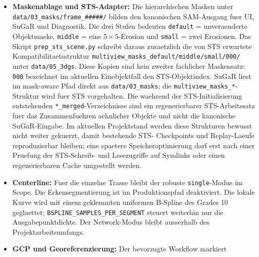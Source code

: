 \documentclass[12pt,a4paper]{article}
\begin{document}
\begin{itemize}
           SuGaR-Dev-Overlay keine Berechtigungsprobleme am internen
           \texttt{/opt/sugar/output}-Pfad erzeugt. Fuer die Poisson-Extraktion
           werden Background-Punktwolken mit weniger als drei Punkten oder
           ungueltigen Normalen uebersprungen; bei der Alurohr-Geometrie kann
           der Background durch die kamera-basierte Bounding-Box auf nur ein
           oder zwei Punkte schrumpfen, waehrend das Foreground-Mesh gueltig
           bleibt.
    \item \textbf{Maskenablage und STS-Adapter:} Die hierarchischen Masken
          unter \texttt{data/03\_masks/frame\_\#\#\#\#\#/} bilden den kanonischen
          SAM-Ausgang fuer UI, SuGaR und Diagnostik. Die drei Stufen bedeuten
          \texttt{default} = unveraenderte Objektmaske,
          \texttt{middle} = eine $5\times5$-Erosion und
          \texttt{small} = zwei Erosionen. Das Skript
          \texttt{prep\_sts\_scene.py} schreibt daraus zusaetzlich die von
          STS erwartete Kompatibilitaetsstruktur
          \texttt{multiview\_masks\_default/middle/small/000/} unter
          \texttt{data/05\_3dgs}. Diese Kopien sind kein zweiter fachlicher
          Maskensatz: \texttt{000} bezeichnet im aktuellen Einobjektfall den
          STS-Objektindex. SuGaR liest im mask-aware Pfad direkt aus
          \texttt{data/03\_masks}; die \texttt{multiview\_masks\_*}-Struktur
          wird fuer STS vorgehalten. Die waehrend der STS-Initialisierung
          entstehenden \texttt{*\_merged}-Verzeichnisse sind ein regenerierbarer
          STS-Arbeitssatz fuer das Zusammenfuehren aehnlicher Objekte und nicht
          die kanonische SuGaR-Eingabe. Im aktuellen Projektstand werden diese
          Strukturen bewusst nicht weiter gekuerzt, damit bestehende STS-
          Checkpoints und Replay-Laeufe reproduzierbar bleiben; eine spaetere
          Speicheroptimierung darf erst nach einer Pruefung der STS-Schreib-
          und Lesezugriffe auf Symlinks oder einen regenerierbaren Cache
          umgestellt werden.
    \item \textbf{Centerline:} Fuer die einzelne Trasse bleibt der robuste
          \texttt{single}-Modus im Scope. Die Eckensegmentierung ist im
          Produktionspfad deaktiviert. Die lokale Kurve wird mit einem
          geklemmten uniformen B-Spline des Grades 10 geglaettet;
          \texttt{BSPLINE\_SAMPLES\_PER\_SEGMENT} steuert weiterhin nur die
          Ausgabepunktdichte. Der Network-Modus bleibt ausserhalb des
          Projektarbeitsumfangs.
    \item \textbf{GCP und Georeferenzierung:} Der bevorzugte Workflow markiert

\end{itemize}
\end{document}
